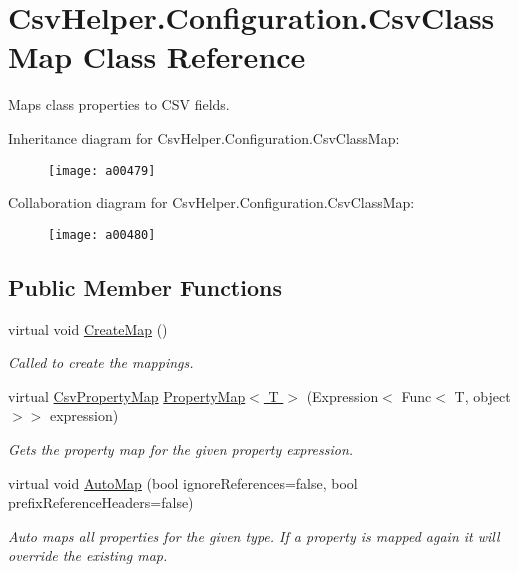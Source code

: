 \hypertarget{a00062}{\section{Csv\-Helper.\-Configuration.\-Csv\-Class\-Map Class Reference}
\label{a00062}
}


Maps class properties to C\-S\-V fields.  




Inheritance diagram for Csv\-Helper.\-Configuration.\-Csv\-Class\-Map\-:
\nopagebreak
\begin{figure}[H]
\begin{center}
\leavevmode
\texttt{[image: a00479]}
\end{center}
\end{figure}


Collaboration diagram for Csv\-Helper.\-Configuration.\-Csv\-Class\-Map\-:
\nopagebreak
\begin{figure}[H]
\begin{center}
\leavevmode
\texttt{[image: a00480]}
\end{center}
\end{figure}
\subsection*{Public Member Functions}
\begin{DoxyCompactItemize}
\item 
virtual void \hyperlink{a00062_a83de9d28160d0d3da1e017df554a9481}{Create\-Map} ()
\begin{DoxyCompactList}\small\item\em Called to create the mappings. \end{DoxyCompactList}\item 
virtual \hyperlink{a00072}{Csv\-Property\-Map} \hyperlink{a00062_abab2b5cd5a290fd5d17116430b084420}{Property\-Map$<$ T $>$} (Expression$<$ Func$<$ T, object $>$$>$ expression)
\begin{DoxyCompactList}\small\item\em Gets the property map for the given property expression. \end{DoxyCompactList}\item 
virtual void \hyperlink{a00062_aec2097b09baaaac45171f91592af439d}{Auto\-Map} (bool ignore\-References=false, bool prefix\-Reference\-Headers=false)
\begin{DoxyCompactList}\small\item\em Auto maps all properties for the given type. If a property is mapped again it will override the existing map. \end{DoxyCompactList}\end{DoxyCompactItemize}
